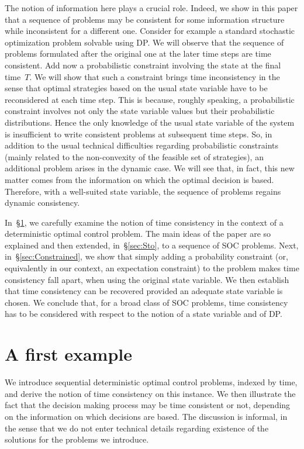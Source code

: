 \documentclass[a4paper]{amsart}
\theoremstyle{plain}
\theoremstyle{definition}
\theoremstyle{remark}
\begin{document}
The notion of information here plays a crucial role. Indeed, we
show in this paper that a sequence of problems may be consistent
for some information structure while inconsistent for a different
one. Consider for example a standard stochastic optimization
problem solvable using DP. We will observe that the sequence of
problems formulated after the original one at the later time steps
are time consistent. Add now a probabilistic constraint involving
the state at the final time~$T$. We will show that such a
constraint brings time inconsistency in the sense that optimal
strategies based on the usual state variable have to be
reconsidered at each time step. This is because, roughly speaking,
a probabilistic constraint involves not only the state variable
values but their probabilistic distributions. Hence the only
knowledge of the usual state variable of the system is
insufficient to write consistent problems at subsequent time
steps. So, in addition to the usual technical difficulties
regarding probabilistic constraints (mainly related to the
non-convexity of the feasible set of strategies), an additional
problem arises in the dynamic case. We will see that, in fact,
this new matter comes from the information on which the optimal
decision is based. Therefore, with a well-suited state variable,
the sequence of problems regains dynamic consistency.

In~\S\ref{sec:Det}, we carefully examine the notion of time
consistency in the context of a deterministic optimal control
problem. The main ideas of the paper are so explained and then
extended, in~\S\ref{sec:Sto}, to a sequence of SOC problems. Next,
in~\S\ref{sec:Constrained}, we show that simply adding a
probability constraint (or, equivalently in our context, an
expectation constraint) to the problem makes time consistency fall
apart, when using the original state variable. We then establish
that time consistency can be recovered provided an adequate state
variable is chosen. We conclude that, for a broad class of SOC
problems, time consistency has to be considered with respect to
the notion of a state variable and of DP.

\section{A first example} \label{sec:Det}

We introduce sequential deterministic optimal control problems,
indexed by time, and derive the notion of time consistency on this
instance. We then illustrate the fact that the decision making
process may be time consistent or not, depending on the
information on which decisions are based. The discussion is
informal, in the sense that we do not enter technical details
regarding existence of the solutions for the problems we
introduce.
\end{document}
